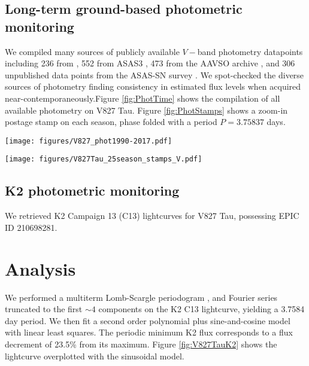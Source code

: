 \documentclass[twocolumn]{emulateapj}%
\begin{document}
\subsection{Long-term ground-based photometric monitoring} \label{sec:archival_phot}

We compiled many sources of publicly available $V-$band photometry datapoints including 236 from \citep{grankin08}, 552 from ASAS3 \citep{pojmanski04}, 473 from the AAVSO archive \citep{kafka16}, and 306 unpublished data points from the ASAS-SN survey \citep{shappee14}.  We spot-checked the diverse sources of photometry finding consistency in estimated flux levels when acquired near-contemporaneously.Figure \ref{fig:PhotTime} shows the compilation of all available photometry on V827 Tau.  Figure \ref{fig:PhotStamps} shows a zoom-in postage stamp on each season, phase folded with a period $P=3.75837$ days.

\begin{figure*}
 \centering
 \texttt{[image: figures/V827\_phot1990-2017.pdf]}
 \caption{Compilation of archival and new flux measurements in $V-$band for V827 Tau, normalized to the global maximum flux value, which occurred in 1990.  The y-axis equals the minimum starspot area, when flux deficits are interpreted with the simplest possible analytic starspot model.}
 \label{fig:PhotTime}
\end{figure*}

\begin{figure*}
 \centering
 \texttt{[image: figures/V827Tau\_25season\_stamps\_V.pdf]}
 \caption{Phase-folded $V-$band flux measurements of V827 Tau grouped into 25 observing seasons, and normalized to the global maximum in 1990.  The y-axis equals the minimum starspot area, when flux deficits are interpreted with the simplest possible analytic starspot model.}
 \label{fig:PhotStamps}
\end{figure*}

\subsection{K2 photometric monitoring} \label{sec:K2_obs}

We retrieved K2 Campaign 13 (C13) \cite{2014PASP..126..398H} lightcurves for V827 Tau, possessing EPIC ID 210698281.


\section{Analysis}\label{sec:Analysis}
 We performed a multiterm Lomb-Scargle periodogram \citep{ivezic14}, and Fourier series truncated to the first $\sim 4$ components \citep{vanderplas15a} on the K2 C13 lightcurve, yielding a 3.7584 day period.  We then fit a second order polynomial plus sine-and-cosine model with linear least squares.  The periodic minimum K2 flux corresponds to a flux decrement of 23.5\% from its maximum.  Figure \ref{fig:V827TauK2} shows the lightcurve overplotted with the sinusoidal model.
\end{document}
